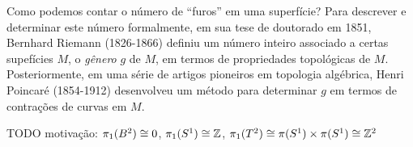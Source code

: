 Como podemos contar o número de ``furos'' em uma superfície? Para descrever e determinar este número formalmente, em sua tese de doutorado em 1851, Bernhard Riemann (1826-1866) definiu um número inteiro associado a certas supefícies $M$, \linebreak o \emph{gênero} $g$ de $M$, em termos de propriedades topológicas de $M$. Posteriormente, em uma série de artigos pioneiros em topologia algébrica, Henri Poincaré (1854-1912) desenvolveu um método para determinar $g$ em termos de contrações de curvas em $M$.%
\linebreak\vspace{-1.2em}

{\color{red} TODO motivação: $\pi_1(B^2) \cong 0$, $\pi_1(S^1) \cong \mathbb{Z}$, $\pi_1(T^2) \cong \pi(S^1) \times \pi(S^1) \cong \mathbb{Z}^2$}

